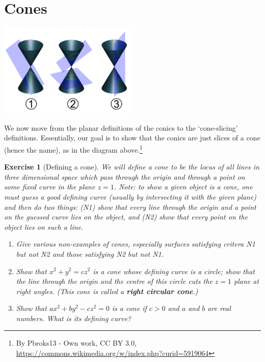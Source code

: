\documentclass[a4paper,leqno,10pt]{article}
\theoremstyle{exercise}
\newtheorem{Exercise}{Exercise}
\newenvironment{exercise}
  {\begin{mdframed}\begin{Exercise}}
  {\end{Exercise}\end{mdframed}}
\theoremstyle{plain}
\theoremstyle{definition}
\theoremstyle{remark}
\newcommand{\df}{\textbf}
\begin{document}
\section{Cones}
\begin{center}
  \includegraphics[width=0.5\textwidth]{slices}
\end{center}
We now move from the planar definitions of the conics to the `cone-slicing' definitions. Essentially, our goal
is to show that the conics are just slices of a cone (hence the name), as in the diagram above.\footnote{By Pbroks13 - Own work, CC BY 3.0, \url{https://commons.wikimedia.org/w/index.php?curid=5919064}}

\begin{exercise}[Defining a cone]
  We will define a cone to be the locus of all lines in three dimensional space which pass through the origin and through a point on some
  fixed curve in the plane $ z = 1 $. Note: to show a given object is a cone, one must guess a good defining curve (usually by intersecting
  it with the given plane) and then do two things: (N1) show that every line through the origin and a point on the guessed curve lies on the
  object, and (N2) show that every point on the object lies on such a line.
  \begin{enumerate}
    \item Give various non-examples of cones, especially surfaces satisfying critera N1 but not N2 and those satisfying N2 but not N1.
    \item Show that $ x^2 + y^2 = cz^2 $ is a cone whose defining curve is a circle; show that the line through the origin and the centre
          of this circle cuts the $ z = 1 $ plane at right angles. (This cone is called a \df{right circular cone}.)
    \item Show that $ ax^2 + by^2 - cz^2 = 0 $ is a cone if $ c > 0 $ and $ a $ and $ b $ are real numbers. What is its defining curve?
  \end{enumerate}
\end{exercise}
\end{document}
